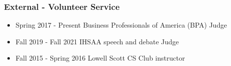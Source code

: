 \documentclass{shanep}
\begin{document}
\subsubsection*{External - Volunteer Service}
\begin{itemize}
  \item Spring 2017 - Present Business Professionals of America (BPA) Judge
  \item Fall 2019 - Fall 2021 IHSAA speech and debate Judge
  \item Fall 2015 - Spring 2016 Lowell Scott CS Club instructor
\end{itemize}

\updateinfo
\end{document}
